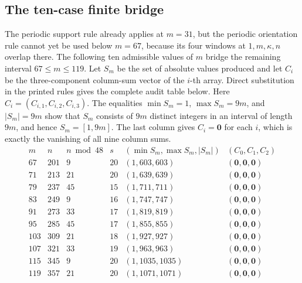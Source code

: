 \subsection{The ten-case finite bridge}\label{sec:bridge-data}
The periodic support rule already applies at \(m=31\), but the periodic orientation rule cannot
yet be used below \(m=67\), because its four windows at \(1,m,\kappa,n\) overlap there.
The following ten admissible values
of \(m\) bridge the remaining interval \(67\le m\le119\).  Let \(S_m\) be the set of absolute
values produced and let
\(C_i\) be the three-component column-sum vector of the \(i\)-th array.  Direct substitution
in the printed rules gives the complete audit table below.  Here
\(C_i=(C_{i,1},C_{i,2},C_{i,3})\).  The equalities \(\min S_m=1\), \(\max S_m=9m\), and
\(|S_m|=9m\) show that \(S_m\) consists of \(9m\) distinct integers in an interval of
length \(9m\), and hence \(S_m=[1,9m]\).  The last column gives \(C_i=\mathbf0\) for
each \(i\), which is exactly the vanishing of all nine column sums.
\[
\begin{array}{c|c|c|c|c|c}
m&n&n\bmod48&s&(\min S_m,\max S_m,|S_m|)&(C_0,C_1,C_2)\\\hline
67&201&9&20&(1,603,603)&(\mathbf{0},\mathbf{0},\mathbf{0})\\
71&213&21&20&(1,639,639)&(\mathbf{0},\mathbf{0},\mathbf{0})\\
79&237&45&15&(1,711,711)&(\mathbf{0},\mathbf{0},\mathbf{0})\\
83&249&9&16&(1,747,747)&(\mathbf{0},\mathbf{0},\mathbf{0})\\
91&273&33&17&(1,819,819)&(\mathbf{0},\mathbf{0},\mathbf{0})\\
95&285&45&17&(1,855,855)&(\mathbf{0},\mathbf{0},\mathbf{0})\\
103&309&21&18&(1,927,927)&(\mathbf{0},\mathbf{0},\mathbf{0})\\
107&321&33&19&(1,963,963)&(\mathbf{0},\mathbf{0},\mathbf{0})\\
115&345&9&20&(1,1035,1035)&(\mathbf{0},\mathbf{0},\mathbf{0})\\
119&357&21&20&(1,1071,1071)&(\mathbf{0},\mathbf{0},\mathbf{0})\\
\end{array}
\]
